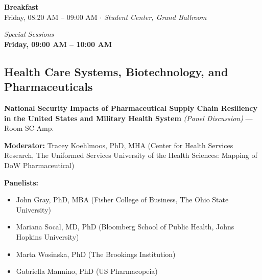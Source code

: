 \documentclass[
  10pt,
  letterpaper,
  DIV=11,
  numbers=noendperiod]{scrartcl}
\providecommand{\tightlist}{%
  \setlength{\itemsep}{0pt}\setlength{\parskip}{0pt}}\usepackage{longtable,booktabs,array}
\begin{document}
\begin{center}
\colorbox{event!15}{\parbox{0.9\linewidth}{\centering
  \textcolor{event}{\large\textbf{Breakfast}}\\[2pt]
  {\small Friday, 08:20 AM – 09:00 AM $\cdot$ \textit{Student Center, Grand Ballroom}}
}}
\end{center}

\vspace{1em}


\begin{center}
\normalsize\textit{Special Sessions}\\[0.3em]
\Large\textbf{Friday, 09:00 AM – 10:00 AM}
\end{center}

\subsection{\texorpdfstring{\textcolor{health}{Health Care Systems, Biotechnology, and Pharmaceuticals}}{}}\label{section-50}

\textbf{National Security Impacts of Pharmaceutical Supply Chain
Resiliency in the United States and Military Health System} \emph{(Panel
Discussion)} --- Room SC-Amp.

\textbf{Moderator:} Tracey Koehlmoos, PhD, MHA (Center for Health
Services Research, The Uniformed Services University of the Health
Sciences: Mapping of DoW Pharmaceutical)

\textbf{Panelists:}

\begin{itemize}
\tightlist
\item
  John Gray, PhD, MBA (Fisher College of Business, The Ohio State
  University)
\item
  Mariana Socal, MD, PhD (Bloomberg School of Public Health, Johns
  Hopkins University)
\item
  Marta Wosinska, PhD (The Brookings Institution)
\item
  Gabriella Mannino, PhD (US Pharmacopeia)
\end{itemize}
\end{document}
